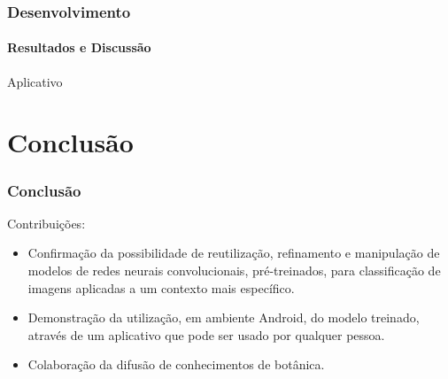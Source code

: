 \documentclass{beamer}
\begin{document}
    \begin{frame}[t]
    		\frametitle{Desenvolvimento}
    		\framesubtitle{Resultados e Discussão}		
		Aplicativo \medskip
		\begin{center}
		\end{center}
    \end{frame}
    
    \section{Conclusão}
      \begin{frame}[t]
      \frametitle{Conclusão}
      Contribuições:
      \begin{itemize} \medskip
      	\item<1-> Confirmação da possibilidade de reutilização, refinamento e manipulação de modelos de redes neurais convolucionais, pré-treinados, para classificação de imagens aplicadas a um contexto mais específico.
		\item<2-> Demonstração da utilização, em ambiente Android, do modelo treinado, através de um aplicativo que pode ser usado por qualquer pessoa. \medskip
		\item<3-> Colaboração da difusão de conhecimentos de botânica. \medskip
      \end{itemize}       
        
    \end{frame}
    
\end{document}
